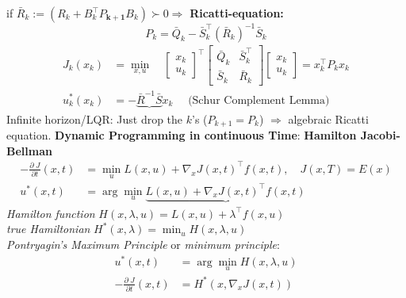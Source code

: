 \begin{tcolorbox}[colback=yellow!5!white,colframe=yellow!75!black,title=\textbf{Dynamic Programming}]
	if $ \bar{R}_k := (R_k + B_k^\top P_{\mathbf{k+1}} B_k) \succ 0 \Rightarrow$
  \textbf{Ricatti-equation:}
	\begin{equation*}
		P_k = \bar{Q}_k -\bar{S}_k ^\top (\bar{R}_k)^{-1} \bar{S}_k
	\end{equation*}
	\begin{align*}
		J_k(x_k) &= 
		\min_{x,u}\quad
		\begin{bmatrix}
			x_k\\ u_k
		\end{bmatrix}^\top
		\begin{bmatrix}
			\bar{Q}_k & \bar{S}_k^\top\\ \bar{S}_k & \bar{R}_k
		\end{bmatrix}
		\begin{bmatrix}
			x_k\\ u_k
		\end{bmatrix}
		= x^\top_k P_k x_k\\
		u_k^*(x_k) &= - \underbrace{\bar{R}^{-1} \bar{S}} x_k \quad \text{ (Schur Complement Lemma)}
	\end{align*}
  Infinite horizon/LQR: Just drop the $k$'s ($P_{k+1} = P_k$) $\Rightarrow$
  algebraic Ricatti equation.
\tcblower
\textbf{Dynamic Programming in continuous Time}:
\textbf{Hamilton Jacobi-Bellman}
\begin{align*}
	- \frac{\partial\; J}{\partial t} (x, t) &= \min_u L(x,u) + \nabla_x J(x,t)^\top f(x, t), \quad J(x, T) = E(x)\\
	u^*(x,t) &= \arg \min_u \underbrace{L(x,u) + \nabla_x J(x,t)^\top f(x, t)}
\end{align*}
\textit{Hamilton function} $H(x,\lambda,u)  = L(x,u) + \lambda^\top f(x,u)$\\
\textit{true Hamiltonian} $H^*(x,\lambda) = \min_u H(x,\lambda, u)$\\
\textit{Pontryagin's Maximum Principle} or \textit{minimum principle}:\\
\begin{align*}
	 u^*(x,t) &= \arg \min_u  H(x,\lambda,u)\\
	- \frac{\partial\; J}{\partial t} (x, t)  &= H^*(x,\nabla_x J(x,t))
\end{align*}


\end{tcolorbox}
